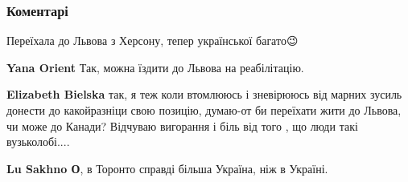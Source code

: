  
 
 
 
 
\subsubsection{Коментарі}

\begin{itemize}
 
Переїхала до Львова з Херсону, тепер української багато😉

\begin{itemize}
 
\textbf{Yana Orient} Так, можна їздити до Львова на реабілітацію. \Smiley[1.0][yellow]

 
\textbf{Elizabeth Bielska} так, я теж коли втомлююсь і зневірююсь від марних
зусиль донести до какойразніци свою позицію, думаю-от би переїхати жити до
Львова, чи може до Канади? Відчуваю вигорання і біль від того , що люди такі
вузьколобі....

 
\textbf{Lu Sakhno О}, в Торонто справді більша Україна, ніж в Україні.


\end{itemize}
\end{itemize}

